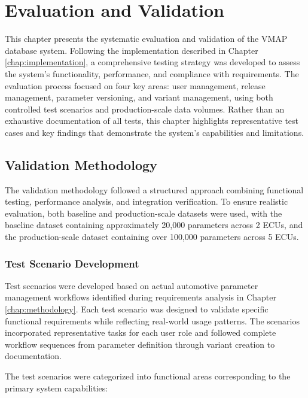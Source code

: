 \chapter{Evaluation and Validation}
\label{chap:evaluation}

This chapter presents the systematic evaluation and validation of the \ac{VMAP} database system. Following the implementation described in Chapter \ref{chap:implementation}, a comprehensive testing strategy was developed to assess the system's functionality, performance, and compliance with requirements. The evaluation process focused on four key areas: user management, release management, parameter versioning, and variant management, using both controlled test scenarios and production-scale data volumes. Rather than an exhaustive documentation of all tests, this chapter highlights representative test cases and key findings that demonstrate the system's capabilities and limitations.

\section{Validation Methodology}
\label{sec:validation-methodology}

The validation methodology followed a structured approach combining functional testing, performance analysis, and integration verification. To ensure realistic evaluation, both baseline and production-scale datasets were used, with the baseline dataset containing approximately 20,000 parameters across 2 \acp{ECU}, and the production-scale dataset containing over 100,000 parameters across 5 \acp{ECU}.

\subsection{Test Scenario Development}
\label{subsec:test-scenario-development}

Test scenarios were developed based on actual automotive parameter management workflows identified during requirements analysis in Chapter \ref{chap:methodology}. Each test scenario was designed to validate specific functional requirements while reflecting real-world usage patterns. The scenarios incorporated representative tasks for each user role and followed complete workflow sequences from parameter definition through variant creation to documentation.

The test scenarios were categorized into functional areas corresponding to the primary system capabilities:

